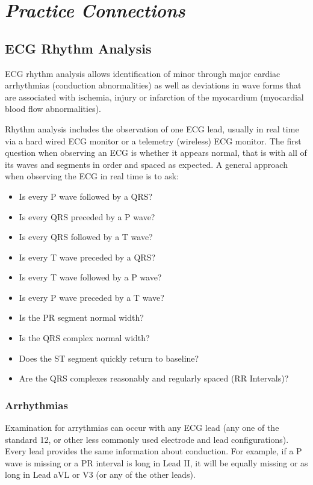 \section{\textit{Practice Connections}} 

\subsection{ECG Rhythm Analysis}

ECG rhythm analysis allows identification of minor through major cardiac arrhythmias (conduction abnormalities) as well as deviations in wave forms that are associated with ischemia, injury or infarction of the myocardium (myocardial blood flow abnormalities). 

Rhythm analysis includes the observation of one ECG lead, usually in real time via a hard wired ECG monitor or a telemetry (wireless) ECG monitor. The first question when observing an ECG is whether it appears normal, that is with all of its waves and segments in order and spaced as expected. A general approach when observing the ECG in real time is to ask:

\begin{itemize}
    \item Is every P wave followed by a QRS?
    \item Is every QRS preceded by a P wave?
    \item Is every QRS followed by a T wave?
    \item Is every T wave preceded by a QRS?
    \item Is every T wave followed by a P wave?
    \item Is every P wave preceded by a T wave?
    \item Is the PR segment normal width?
    \item Is the QRS complex normal width?
    \item Does the ST segment quickly return to baseline?
    \item Are the QRS complexes reasonably and regularly spaced (RR Intervals)?
\end{itemize}


\subsubsection{Arrhythmias}

Examination for arrythmias can occur with any ECG lead (any one of the standard 12, or other less commonly used electrode and lead configurations). Every lead provides the same information about conduction. For example, if a P wave is missing or a PR interval is long in Lead II, it will be equally missing or as long in Lead aVL or V3 (or any of the other leads). 

